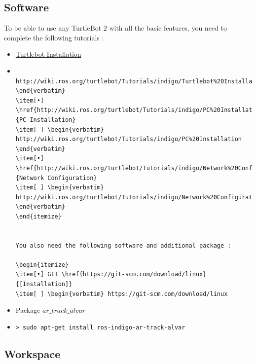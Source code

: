 \documentclass[10pt,a4paper]{article}
\begin{document}
\subsection{Software}

To be able to use any TurtleBot 2 with all the basic features, you need to complete the following tutorials :

\begin{itemize}
\item[•] \href{http://wiki.ros.org/turtlebot/Tutorials/indigo/Turtlebot%20Installation}{Turtlebot Installation} 
\item[ ] \begin{verbatim} http://wiki.ros.org/turtlebot/Tutorials/indigo/Turtlebot%20Installation \end{verbatim}
\item[•] \href{http://wiki.ros.org/turtlebot/Tutorials/indigo/PC%20Installation}{PC Installation} 
\item[ ] \begin{verbatim} http://wiki.ros.org/turtlebot/Tutorials/indigo/PC%20Installation \end{verbatim}
\item[•] \href{http://wiki.ros.org/turtlebot/Tutorials/indigo/Network%20Configuration}{Network Configuration} 
\item[ ] \begin{verbatim} http://wiki.ros.org/turtlebot/Tutorials/indigo/Network%20Configuration \end{verbatim}
\end{itemize}


You also need the following software and additional package :

\begin{itemize}
\item[•] GIT \href{https://git-scm.com/download/linux}{[Installation]} 
\item[ ] \begin{verbatim} https://git-scm.com/download/linux \end{verbatim}
\item[•] Package $ar\_track\_alvar$ 
\item[ ] \begin{verbatim}> sudo apt-get install ros-indigo-ar-track-alvar \end{verbatim}
\end{itemize}

\subsection{Workspace}
\label{sec:workspace}
\end{document}
